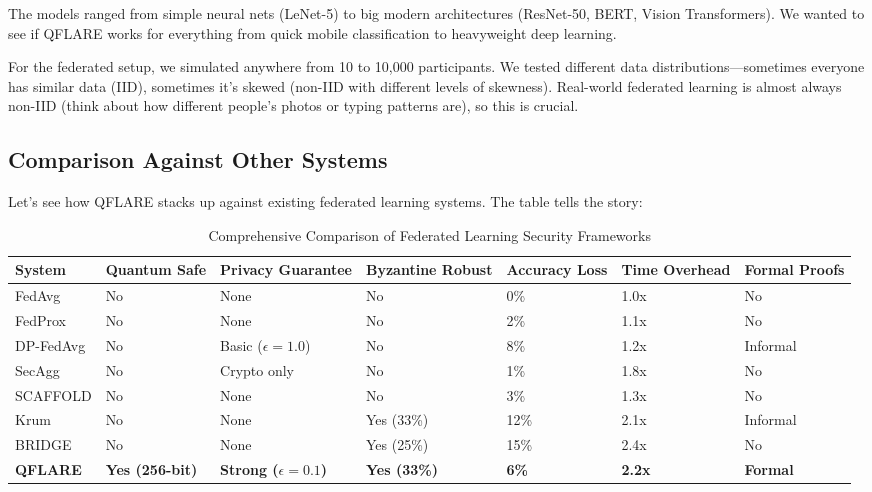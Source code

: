 \documentclass[journal]{IEEEtran}
\begin{document}
The models ranged from simple neural nets (LeNet-5) to big modern architectures (ResNet-50, BERT, Vision Transformers). We wanted to see if QFLARE works for everything from quick mobile classification to heavyweight deep learning.

For the federated setup, we simulated anywhere from 10 to 10,000 participants. We tested different data distributions—sometimes everyone has similar data (IID), sometimes it's skewed (non-IID with different levels of skewness). Real-world federated learning is almost always non-IID (think about how different people's photos or typing patterns are), so this is crucial.

\subsection{Comparison Against Other Systems}

Let's see how QFLARE stacks up against existing federated learning systems. The table tells the story:

\begin{table}[htbp]
\centering
\caption{Comprehensive Comparison of Federated Learning Security Frameworks}
\label{tab:comprehensive_comparison}
\scriptsize
\begin{tabular}{@{}p{2cm}p{1.3cm}p{1.3cm}p{1.3cm}p{1.3cm}p{1.3cm}p{1.3cm}@{}}
\toprule
\textbf{System} & \textbf{Quantum Safe} & \textbf{Privacy Guarantee} & \textbf{Byzantine Robust} & \textbf{Accuracy Loss} & \textbf{Time Overhead} & \textbf{Formal Proofs} \\
\midrule
FedAvg & No & None & No & 0\% & 1.0x & No \\
FedProx & No & None & No & 2\% & 1.1x & No \\
DP-FedAvg & No & Basic ($\epsilon=1.0$) & No & 8\% & 1.2x & Informal \\
SecAgg & No & Crypto only & No & 1\% & 1.8x & No \\
SCAFFOLD & No & None & No & 3\% & 1.3x & No \\
Krum & No & None & Yes (33\%) & 12\% & 2.1x & Informal \\
BRIDGE & No & None & Yes (25\%) & 15\% & 2.4x & No \\
\midrule
\textbf{QFLARE} & \textbf{Yes (256-bit)} & \textbf{Strong ($\epsilon=0.1$)} & \textbf{Yes (33\%)} & \textbf{6\%} & \textbf{2.2x} & \textbf{Formal} \\
\bottomrule
\end{tabular}
\end{table}
\end{document}
